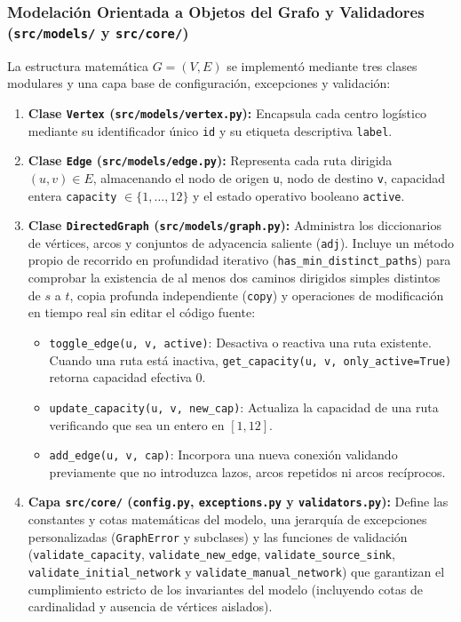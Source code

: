 \documentclass[11pt,a4paper]{article}
\begin{document}
\subsubsection{Modelación Orientada a Objetos del Grafo y Validadores (\texttt{src/models/} y \texttt{src/core/})}
La estructura matemática $G = (V, E)$ se implementó mediante tres clases modulares y una capa base de configuración, excepciones y validación:
\begin{enumerate}
    \item \textbf{Clase \texttt{Vertex} (\texttt{src/models/vertex.py}):} Encapsula cada centro logístico mediante su identificador único \texttt{id} y su etiqueta descriptiva \texttt{label}.
    \item \textbf{Clase \texttt{Edge} (\texttt{src/models/edge.py}):} Representa cada ruta dirigida $(u, v) \in E$, almacenando el nodo de origen \texttt{u}, nodo de destino \texttt{v}, capacidad entera \texttt{capacity} $\in \{1, \dots, 12\}$ y el estado operativo booleano \texttt{active}.
    \item \textbf{Clase \texttt{DirectedGraph} (\texttt{src/models/graph.py}):} Administra los diccionarios de vértices, arcos y conjuntos de adyacencia saliente (\texttt{adj}). Incluye un método propio de recorrido en profundidad iterativo (\texttt{has\_min\_distinct\_paths}) para comprobar la existencia de al menos dos caminos dirigidos simples distintos de $s$ a $t$, copia profunda independiente (\texttt{copy}) y operaciones de modificación en tiempo real sin editar el código fuente:
    \begin{itemize}
        \item \texttt{toggle\_edge(u, v, active)}: Desactiva o reactiva una ruta existente. Cuando una ruta está inactiva, \texttt{get\_capacity(u, v, only\_active=True)} retorna capacidad efectiva $0$.
        \item \texttt{update\_capacity(u, v, new\_cap)}: Actualiza la capacidad de una ruta verificando que sea un entero en $[1, 12]$.
        \item \texttt{add\_edge(u, v, cap)}: Incorpora una nueva conexión validando previamente que no introduzca lazos, arcos repetidos ni arcos recíprocos.
    \end{itemize}
    \item \textbf{Capa \texttt{src/core/} (\texttt{config.py}, \texttt{exceptions.py} y \texttt{validators.py}):} Define las constantes y cotas matemáticas del modelo, una jerarquía de excepciones personalizadas (\texttt{GraphError} y subclases) y las funciones de validación (\texttt{validate\_capacity}, \texttt{validate\_new\_edge}, \texttt{validate\_source\_sink}, \texttt{validate\_initial\_network} y \texttt{validate\_manual\_network}) que garantizan el cumplimiento estricto de los invariantes del modelo (incluyendo cotas de cardinalidad y ausencia de vértices aislados).
\end{enumerate}
\end{document}

